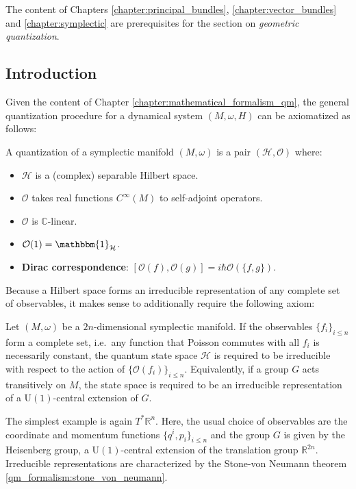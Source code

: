 \chapter{}\label{chapter:quantization}

    The content of Chapters \ref{chapter:principal_bundles}, \ref{chapter:vector_bundles} and \ref{chapter:symplectic} are prerequisites for the section on \textit{geometric quantization}.

\section{Introduction}

    Given the content of Chapter \ref{chapter:mathematical_formalism_qm}, the general quantization procedure for a dynamical system $(M,\omega,H)$ can be axiomatized as follows:
    \begin{method}\label{quantization:axioms}
        A quantization of a symplectic manifold $(M,\omega)$ is a pair $(\mathcal{H},\mathcal{O})$ where:
        \begin{itemize}
            \item $\mathcal{H}$ is a (complex) separable Hilbert space.
            \item $\mathcal{O}$ takes real functions $C^\infty(M)$ to self-adjoint operators.
            \item $\mathcal{O}$ is $\mathbb{C}$-linear.
            \item $\mathcal{O}(1) = \mathbbm{1}_{\mathcal{H}}$.
            \item \textbf{Dirac correspondence}: $[\mathcal{O}(f),\mathcal{O}(g)] = i\hbar\mathcal{O}(\{f,g\})$.
        \end{itemize}
    \end{method}

    Because a Hilbert space forms an irreducible representation of any complete set of observables, it makes sense to additionally require the following axiom:
    \begin{axiom}
        Let $(M,\omega)$ be a $2n$-dimensional symplectic manifold. If the observables $\{f_i\}_{i\leq n}$ form a complete set, i.e.~any function that Poisson commutes with all $f_i$ is necessarily constant, the quantum state space $\mathcal{H}$ is required to be irreducible with respect to the action of $\{\mathcal{O}(f_i)\}_{i\leq n}$. Equivalently, if a group $G$ acts transitively on $M$, the state space is required to be an irreducible representation of a $\mathrm{U}(1)$-central extension of $G$.
    \end{axiom}
    The simplest example is again $T^*\mathbb{R}^n$. Here, the usual choice of observables are the coordinate and momentum functions $\{q^i,p_i\}_{i\leq n}$ and the group $G$ is given by the Heisenberg group, a $\mathrm{U}(1)$-central extension of the translation group $\mathbb{R}^{2n}$. Irreducible representations are characterized by the Stone-von Neumann theorem \ref{qm_formalism:stone_von_neumann}.

